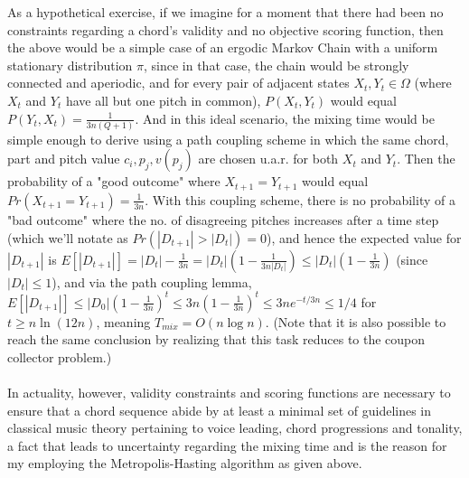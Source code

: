 \documentclass[twoside]{article}
\begin{document}
	As a hypothetical exercise, if we imagine for a moment that there had been no constraints regarding a chord's validity and no objective scoring function, then the above would be a simple case of an ergodic Markov Chain with a uniform stationary distribution $\pi$, since in that case, the chain would be strongly connected and aperiodic, and for every pair of adjacent states $X_t,Y_t \in \Omega$ (where $X_t$ and $Y_t$ have all but one pitch in common), $P(X_t,Y_t)$ would equal $P(Y_t,X_t)=\frac{1}{3n(Q+1)}$. And in this ideal scenario, the mixing time would be simple enough to derive using a path coupling scheme in which the same chord, part and pitch value $c_i, p_j, v(p_j)$ are chosen u.a.r. for both $X_t$ and $Y_t$. Then the probability of a "good outcome" where $X_{t+1}=Y_{t+1}$ would equal $Pr(X_{t+1}=Y_{t+1})=\frac{1}{3n}$. With this coupling scheme, there is no probability of a "bad outcome" where the no. of disagreeing pitches increases after a time step (which we'll notate as $Pr(|D_{t+1}|>|D_t|) = 0$), and hence the expected value for $|D_{t+1}|$ is $E[|D_{t+1}|]=|D_t| - \frac{1}{3n} = |D_t|(1 - \frac{1}{3n|D_t|}) \leq |D_t|(1 - \frac{1}{3n})$ (since $|D_t| \leq 1$), and via the path coupling lemma, $E[|D_{t+1}|] \leq |D_0|(1 - \frac{1}{3n})^t \leq 3n(1-\frac{1}{3n})^t \leq 3ne^{-t/3n} \leq 1/4$ for $t \geq n \ln (12n)$, meaning $T_{mix}=O(n \log n)$. (Note that it is also possible to reach the same conclusion by realizing that this task reduces to the coupon collector problem.)
	\\\\
	In actuality, however, validity constraints and scoring functions are necessary to ensure that a chord sequence abide by at least a minimal set of guidelines in classical music theory pertaining to voice leading, chord progressions and tonality, a fact that leads to uncertainty regarding the mixing time and is the reason for my employing the Metropolis-Hasting algorithm as given above.
\end{document}
